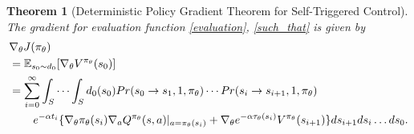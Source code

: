 \documentclass[english, dvipdfmx]{ampmt}             %
\newcommand{\expect}{\mathbb{E}}
\newtheorem{th.}{Theorem}
\begin{document}
\begin{th.}[Deterministic Policy Gradient Theorem for Self-Triggered Control]
\label{main_theorem}
The gradient for evaluation function \eqref{evaluation}, \eqref{such_that} is given by
\begin{align}
	&\nabla_{\theta}J(\pi_{\theta})\nonumber \\
	&= \expect_{s_0\sim d_0}[\nabla_{\theta}V^{\pi_{\theta}}(s_0)]\nonumber\\
	&= \sum_{i=0}^{\infty}\int_{S}\cdots\int_{S}d_0(s_0)Pr(s_0\to s_1,1,\pi_{\theta})\cdots Pr(s_{i}\to s_{i+1},1,\pi_{\theta})\nonumber\\
	&\hspace{5ex}e^{-\alpha t_i}\{\nabla_{\theta}\pi_{\theta}(s_i)\nabla_aQ^{\pi_{\theta}}(s,a)|_{a=\pi_{\theta}(s_i)} + \nabla_{\theta}e^{-\alpha\tau_{\theta}(s_{i})}V^{\pi_{\theta}}(s_{i+1})\}ds_{i+1}ds_{i}\ldots ds_0. \label{PG_for_STC}
\end{align}
\end{th.}
\end{document}
